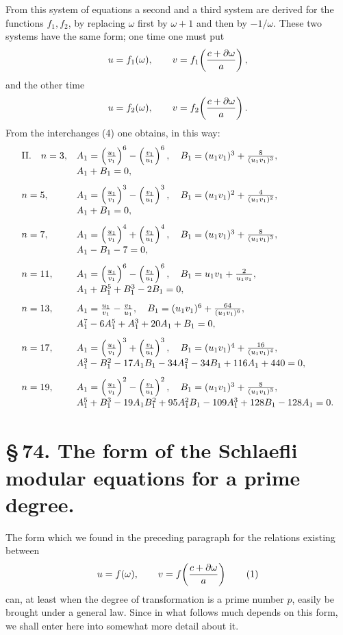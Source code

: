 \documentclass[11pt]{article}
\begin{document}
From this system of equations a second and a third system are derived for the functions $f_1,f_2$, by replacing $\omega$ first by $\omega+1$ and then by $-1/\omega$. These two systems have the same form; one time one must put
\[
 u=f_1(\omega),\qquad v=f_1\!\left({c+\partial\omega\over a}\right),
\]
and the other time
\[
 u=f_2(\omega),\qquad v=f_2\!\left({c+\partial\omega\over a}\right).
\]
From the interchanges (4) one obtains, in this way:
\[
\begin{array}{ll}
\mathrm{II.}\quad n=3,&
 A_1=\left({u_1\over v_1}\right)^6-\left({v_1\over u_1}\right)^6,
 \quad B_1=(u_1v_1)^3+{8\over(u_1v_1)^3},\\[0.4em]
& A_1+B_1=0,\\[0.8em]
 n=5,&
 A_1=\left({u_1\over v_1}\right)^3-\left({v_1\over u_1}\right)^3,
 \quad B_1=(u_1v_1)^2+{4\over(u_1v_1)^2},\\[0.4em]
& A_1+B_1=0,\\[0.8em]
 n=7,&
 A_1=\left({u_1\over v_1}\right)^4+\left({v_1\over u_1}\right)^4,
 \quad B_1=(u_1v_1)^3+{8\over(u_1v_1)^3},\\[0.4em]
& A_1-B_1-7=0,\\[0.8em]
 n=11,&
 A_1=\left({u_1\over v_1}\right)^6-\left({v_1\over u_1}\right)^6,
 \quad B_1=u_1v_1+{2\over u_1v_1},\\[0.4em]
& A_1+B_1^5+B_1^3-2B_1=0,\\[0.8em]
 n=13,&
 A_1={u_1\over v_1}-{v_1\over u_1},
 \quad B_1=(u_1v_1)^6+{64\over(u_1v_1)^6},\\[0.4em]
& A_1^7-6A_1^5+A_1^3+20A_1+B_1=0,\\[0.8em]
 n=17,&
 A_1=\left({u_1\over v_1}\right)^3+\left({v_1\over u_1}\right)^3,
 \quad B_1=(u_1v_1)^4+{16\over(u_1v_1)^4},\\[0.4em]
& A_1^3-B_1^2-17A_1B_1-34A_1^2-34B_1+116A_1+440=0,\\[0.8em]
 n=19,&
 A_1=\left({u_1\over v_1}\right)^2-\left({v_1\over u_1}\right)^2,
 \quad B_1=(u_1v_1)^3+{8\over(u_1v_1)^3},\\[0.4em]
& A_1^5+B_1^3-19A_1B_1^2+95A_1^2B_1-109A_1^3+128B_1-128A_1=0.
\end{array}
\]

\section*{\S\,74. The form of the Schlaefli modular equations for a prime degree.}

The form which we found in the preceding paragraph for the relations existing between
\begin{equation}
 u=f(\omega),\qquad v=f\!\left({c+\partial\omega\over a}\right)
\tag{1}
\end{equation}
can, at least when the degree of transformation is a prime number $p$, easily be brought under a general law. Since in what follows much depends on this form, we shall enter here into somewhat more detail about it.
\end{document}
